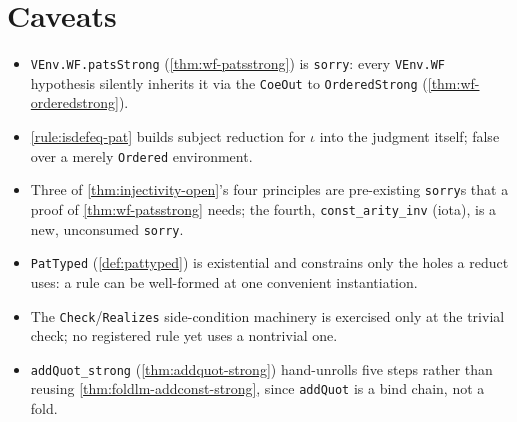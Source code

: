 \section*{Caveats}

\begin{itemize}
\item \texttt{VEnv.WF.patsStrong} (\ref{thm:wf-patsstrong}) is \texttt{sorry}: every
  \texttt{VEnv.WF} hypothesis silently inherits it via the \texttt{CoeOut} to
  \texttt{OrderedStrong} (\ref{thm:wf-orderedstrong}).
\item \ref{rule:isdefeq-pat} builds subject reduction for $\iota$ into the judgment itself;
  false over a merely \texttt{Ordered} environment.
\item Three of \ref{thm:injectivity-open}'s four principles are pre-existing \texttt{sorry}s
  that a proof of \ref{thm:wf-patsstrong} needs; the fourth, \texttt{const\_arity\_inv}
  (iota), is a new, unconsumed \texttt{sorry}.
\item \texttt{PatTyped} (\ref{def:pattyped}) is existential and constrains only the holes a
  reduct uses: a rule can be well-formed at one convenient instantiation.
\item The \texttt{Check}/\texttt{Realizes} side-condition machinery is exercised only at the
  trivial check; no registered rule yet uses a nontrivial one.
\item \texttt{addQuot\_strong} (\ref{thm:addquot-strong}) hand-unrolls five steps rather than
  reusing \ref{thm:foldlm-addconst-strong}, since \texttt{addQuot} is a bind chain, not a
  fold.
\end{itemize}
